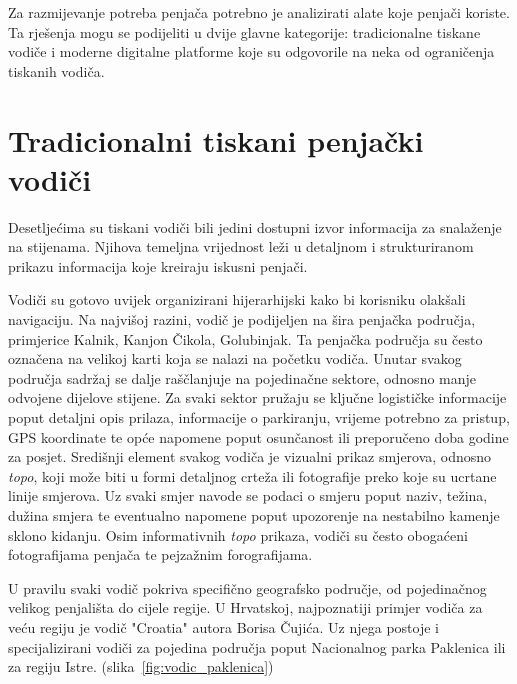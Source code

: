 
Za razmijevanje potreba penjača potrebno je analizirati alate koje penjači koriste. Ta rješenja mogu se podijeliti u dvije glavne kategorije: tradicionalne tiskane vodiče i moderne digitalne platforme koje su odgovorile na neka od ograničenja tiskanih vodiča.

\section{Tradicionalni tiskani penjački vodiči}

Desetljećima su tiskani vodiči bili jedini dostupni izvor informacija za snalaženje na stijenama. Njihova temeljna vrijednost leži u detaljnom i strukturiranom prikazu informacija koje kreiraju iskusni penjači. 

Vodiči su gotovo uvijek organizirani hijerarhijski kako bi korisniku olakšali navigaciju. Na najvišoj razini, vodič je podijeljen na šira penjačka područja, primjerice Kalnik, Kanjon Čikola, Golubinjak. Ta penjačka područja su često označena na velikoj karti koja se nalazi na početku vodiča. Unutar svakog područja sadržaj se dalje raščlanjuje na pojedinačne sektore, odnosno manje odvojene dijelove stijene. Za svaki sektor pružaju se ključne logističke informacije poput detaljni opis prilaza, informacije o parkiranju, vrijeme potrebno za pristup, GPS koordinate te opće napomene poput osunčanost ili preporučeno doba godine za posjet. 
Središnji element svakog vodiča je vizualni prikaz smjerova, odnosno \textit{topo}, koji može biti u formi detaljnog crteža ili fotografije preko koje su ucrtane linije smjerova. Uz svaki smjer navode se podaci o smjeru poput naziv, težina, dužina smjera te eventualno napomene poput upozorenje na nestabilno kamenje sklono kidanju. Osim informativnih \textit{topo} prikaza, vodiči su često obogaćeni fotografijama penjača te pejzažnim forografijama. 


U pravilu svaki vodič pokriva specifično geografsko područje, od pojedinačnog velikog penjališta do cijele regije. U Hrvatskoj, najpoznatiji primjer vodiča za veću regiju je vodič "Croatia" autora Borisa Čujića. Uz njega postoje i specijalizirani vodiči za pojedina područja poput Nacionalnog parka Paklenica ili za regiju Istre. (slika~\ref{fig:vodic_paklenica})

